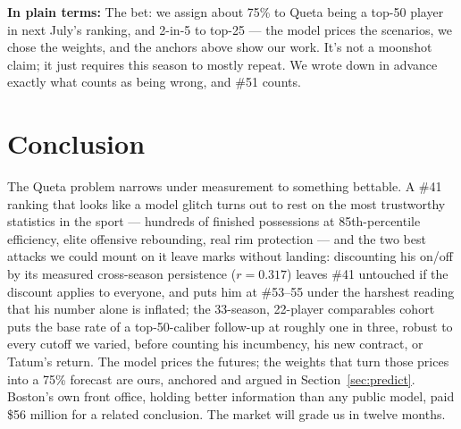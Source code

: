\documentclass[11pt]{article}
\newcommand{\plainbox}[1]{\par\medskip\noindent\begin{center}%
\colorbox{court!8}{\parbox{0.93\textwidth}{\small \textbf{\textcolor{court}{In plain terms:}} #1}}%
\end{center}\medskip}
\begin{document}
\plainbox{The bet: we assign about 75\% to Queta being a top-50 player in next July's
ranking, and 2-in-5 to top-25 --- the model prices the scenarios, we chose the weights,
and the anchors above show our work. It's not a moonshot claim; it just requires this
season to mostly repeat. We wrote down in advance exactly what counts as being wrong,
and \#51 counts.}

\section{Conclusion}

The Queta problem narrows under measurement to something bettable. A \#41 ranking that
looks like a model glitch turns out to rest on the most trustworthy statistics in the
sport --- hundreds of finished possessions at 85th-percentile efficiency, elite
offensive rebounding, real rim protection --- and the two best attacks we could mount
on it leave marks without landing: discounting his on/off by its measured cross-season
persistence ($r = 0.317$) leaves \#41 untouched if the discount applies to everyone,
and puts him at \#53--55 under the harshest reading that his number alone is inflated;
the 33-season, 22-player comparables cohort puts the base rate of a top-50-caliber
follow-up at roughly one in three, robust to every cutoff we varied, before counting
his incumbency, his new contract, or Tatum's return. The model prices the futures; the
weights that turn those prices into a 75\% forecast are ours, anchored and argued in
Section~\ref{sec:predict}. Boston's own front office, holding better information than
any public model, paid \$56 million for a related conclusion. The market will grade us
in twelve months.
\end{document}
